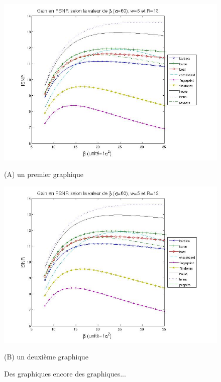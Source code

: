 \documentclass[11pt]{article}
\theoremstyle{remark}
\theoremstyle{definition}
\begin{document}
\begin{figure}[htb]
\begin{minipage}[b]{0.48\linewidth}
  \centering
 \centerline{\includegraphics[width=1.44\textwidth]{psnr_sig60.jpg}}
  \vspace{0.1cm}
  \centerline{(A) un premier graphique }\medskip
\end{minipage}
\hfill
\begin{minipage}[b]{.48\linewidth}
  \centering
 \centerline{\includegraphics[width=1.44\textwidth]{psnr_sig60.jpg}}
  \vspace{0.1cm}
  \centerline{(B) un deuxième graphique}\medskip
\end{minipage}%

\caption{Des graphiques encore des graphiques...}
\label{fig:ma_figure}
\end{figure}
\end{document}
